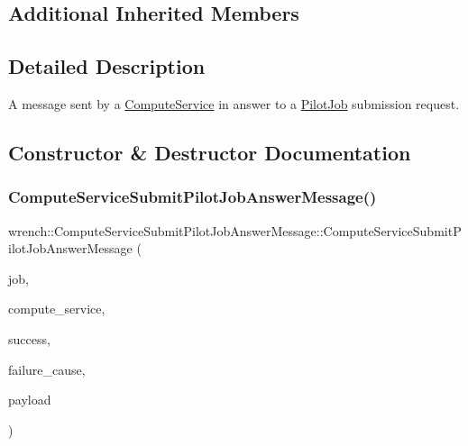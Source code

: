 \subsection*{Additional Inherited Members}


\subsection{Detailed Description}
A message sent by a \hyperlink{classwrench_1_1_compute_service}{Compute\+Service} in answer to a \hyperlink{classwrench_1_1_pilot_job}{Pilot\+Job} submission request. 

\subsection{Constructor \& Destructor Documentation}
\mbox{\label{classwrench_1_1_compute_service_submit_pilot_job_answer_message_a6a6e7ec7535de8a3ecfab14ca982a3a6}} 
\subsubsection{\texorpdfstring{Compute\+Service\+Submit\+Pilot\+Job\+Answer\+Message()}{ComputeServiceSubmitPilotJobAnswerMessage()}}
{\footnotesize\ttfamily wrench\+::\+Compute\+Service\+Submit\+Pilot\+Job\+Answer\+Message\+::\+Compute\+Service\+Submit\+Pilot\+Job\+Answer\+Message (\begin{DoxyParamCaption}\item[{\hyperlink{classwrench_1_1_pilot_job}{Pilot\+Job} $\ast$}]{job,  }\item[{\hyperlink{classwrench_1_1_compute_service}{Compute\+Service} $\ast$}]{compute\+\_\+service,  }\item[{bool}]{success,  }\item[{std\+::shared\+\_\+ptr$<$ \hyperlink{classwrench_1_1_failure_cause}{Failure\+Cause} $>$}]{failure\+\_\+cause,  }\item[{double}]{payload }\end{DoxyParamCaption})}



